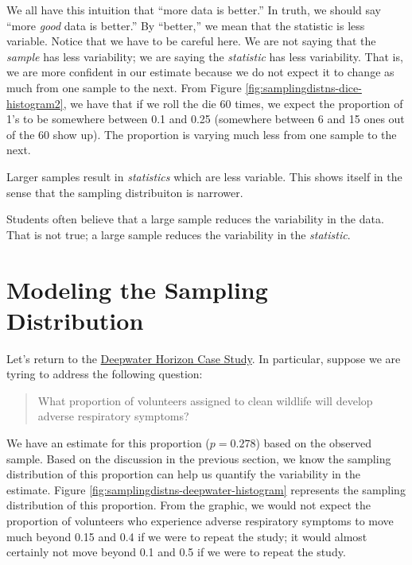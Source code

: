 \documentclass[]{book}
\theoremstyle{definition}
\theoremstyle{definition}
\theoremstyle{definition}
\theoremstyle{remark}
\let\BeginKnitrBlock\begin \let\EndKnitrBlock\end
\begin{document}
We all have this intuition that ``more data is better.'' In truth, we
should say ``more \emph{good} data is better.'' By ``better,'' we mean
that the statistic is less variable. Notice that we have to be careful
here. We are not saying that the \emph{sample} has less variability; we
are saying the \emph{statistic} has less variability. That is, we are
more confident in our estimate because we do not expect it to change as
much from one sample to the next. From Figure
\ref{fig:samplingdistns-dice-histogram2}, we have that if we roll the
die 60 times, we expect the proportion of 1's to be somewhere between
0.1 and 0.25 (somewhere between 6 and 15 ones out of the 60 show up).
The proportion is varying much less from one sample to the next.

\BeginKnitrBlock{rmdkeyidea}
Larger samples result in \emph{statistics} which are less variable. This
shows itself in the sense that the sampling distribuiton is narrower.
\EndKnitrBlock{rmdkeyidea}

\BeginKnitrBlock{rmdtip}
Students often believe that a large sample reduces the variability in
the data. That is not true; a large sample reduces the variability in
the \emph{statistic}.
\EndKnitrBlock{rmdtip}

\section{Modeling the Sampling
Distribution}\label{modeling-the-sampling-distribution}

Let's return to the \protect\hyperlink{CaseDeepwater}{Deepwater Horizon
Case Study}. In particular, suppose we are tyring to address the
following question:

\begin{quote}
What proportion of volunteers assigned to clean wildlife will develop
adverse respiratory symptoms?
\end{quote}

We have an estimate for this proportion (\(p = 0.278\)) based on the
observed sample. Based on the discussion in the previous section, we
know the sampling distribution of this proportion can help us quantify
the variability in the estimate. Figure
\ref{fig:samplingdistns-deepwater-histogram} represents the sampling
distribution of this proportion. From the graphic, we would not expect
the proportion of volunteers who experience adverse respiratory symptoms
to move much beyond 0.15 and 0.4 if we were to repeat the study; it
would almost certainly not move beyond 0.1 and 0.5 if we were to repeat
the study.
\end{document}
